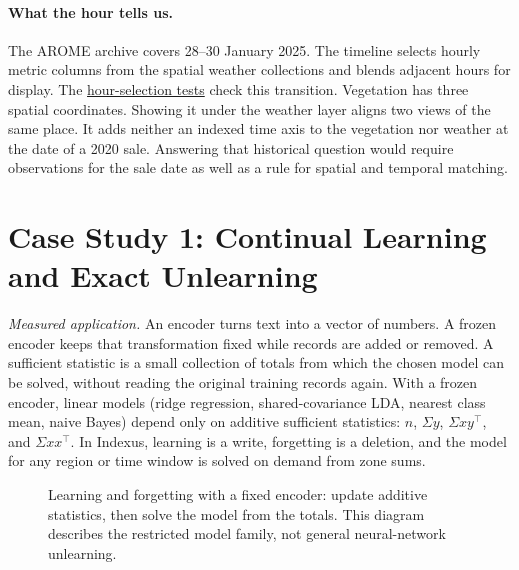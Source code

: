 \documentclass[11pt]{article}
\begin{document}
\paragraph{What the hour tells us.}
The AROME archive covers 28--30 January 2025. The timeline selects hourly metric columns from the spatial weather collections and blends adjacent hours for display. The \href{https://github.com/indexus/experiences/blob/c0e9738/test/weather/field-hours.test.js}{hour-selection tests} check this transition. Vegetation has three spatial coordinates. Showing it under the weather layer aligns two views of the same place. It adds neither an indexed time axis to the vegetation nor weather at the date of a 2020 sale. Answering that historical question would require observations for the sale date as well as a rule for spatial and temporal matching.

\section{Case Study 1: Continual Learning and Exact Unlearning}\hypertarget{ix:unlearning}{}
\noindent\emph{Measured application.}
An encoder turns text into a vector of numbers. A frozen encoder keeps that transformation fixed while records are added or removed. A sufficient statistic is a small collection of totals from which the chosen model can be solved, without reading the original training records again. With a frozen encoder, linear models (ridge regression, shared-covariance LDA, nearest class mean, naive Bayes) depend only on additive sufficient statistics: $n$, $\Sigma y$, $\Sigma x y^\top$, and $\Sigma x x^\top$. In Indexus, learning is a write, forgetting is a deletion, and the model for any region or time window is solved on demand from zone sums.

\begin{figure}[H]
    \centering
    \caption{Learning and forgetting with a fixed encoder: update additive statistics, then solve the model from the totals. This diagram describes the restricted model family, not general neural-network unlearning.}
\end{figure}
\end{document}
